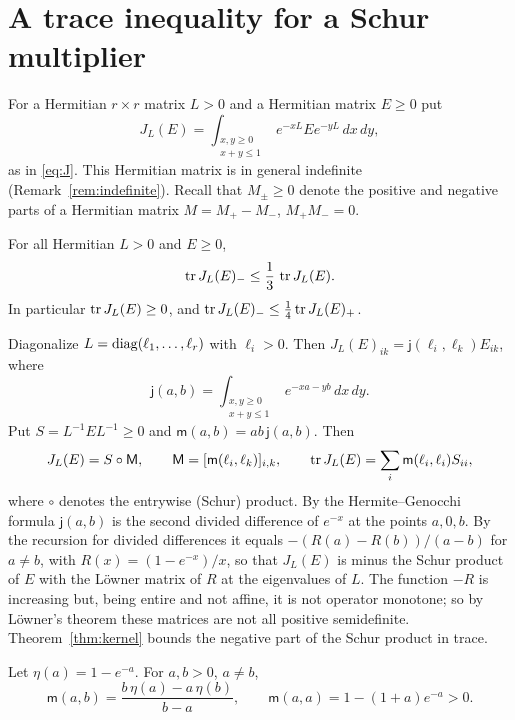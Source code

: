 \section{A trace inequality for a Schur multiplier}\label{sec:kernel}

For a Hermitian $r\times r$ matrix $L>0$ and a Hermitian matrix $E\geq0$ put
\[
 J_L(E)=\int_{\substack{x,y\geq0\\x+y\leq1}}e^{-xL}Ee^{-yL}\,dx\,dy ,
\]
as in \eqref{eq:J}. This Hermitian matrix is in general indefinite
(Remark~\ref{rem:indefinite}). Recall that $M_\pm\geq0$ denote the positive
and negative parts of a Hermitian matrix $M=M_+-M_-$, $M_+M_-=0$.

\begin{theorem}\label{thm:kernel}
For all Hermitian $L>0$ and $E\geq0$,
\[
 \operatorname{tr} J_L(E)_-\leq\frac13\,\operatorname{tr} J_L(E).
\]
In particular $\operatorname{tr} J_L(E)\geq0$, and
$\operatorname{tr} J_L(E)_-\leq\frac14\operatorname{tr} J_L(E)_+$.
\end{theorem}

Diagonalize $L=\operatorname{diag}(\ell_1,\dots,\ell_r)$ with $\ell_i>0$. Then
$J_L(E)_{ik}=\mathsf j(\ell_i,\ell_k)E_{ik}$, where
\[
 \mathsf j(a,b)=\int_{\substack{x,y\geq0\\x+y\leq1}}e^{-xa-yb}\,dx\,dy .
\]
Put $S=L^{-1}EL^{-1}\geq0$ and $\mathsf m(a,b)=ab\,\mathsf j(a,b)$. Then
\begin{equation}\label{eq:schurform}
 J_L(E)=S\circ\mathsf M,\qquad\mathsf M=[\mathsf m(\ell_i,\ell_k)]_{i,k},\qquad
 \operatorname{tr} J_L(E)=\sum_i\mathsf m(\ell_i,\ell_i)S_{ii},
\end{equation}
where $\circ$ denotes the entrywise (Schur) product. By the Hermite--Genocchi
formula $\mathsf j(a,b)$ is the second divided difference of $e^{-x}$ at the
points $a,0,b$. By the recursion for divided differences it equals
$-(R(a)-R(b))/(a-b)$ for $a\neq b$, with $R(x)=(1-e^{-x})/x$, so that
$J_L(E)$ is minus the Schur product of $E$ with the L\"owner matrix of $R$ at
the eigenvalues of $L$. The function $-R$ is increasing but, being entire and
not affine, it is not operator monotone; so by L\"owner's theorem
\cite{bha97} these matrices are not all positive semidefinite. Theorem~\ref{thm:kernel} bounds
the negative part of the Schur product in trace.

\begin{lemma}\label{lem:mformula}
Let $\eta(a)=1-e^{-a}$. For $a,b>0$, $a\ne b$,
\[
 \mathsf m(a,b)=\frac{b\,\eta(a)-a\,\eta(b)}{b-a},\qquad
 \mathsf m(a,a)=1-(1+a)e^{-a}>0 .
\]
\end{lemma}

